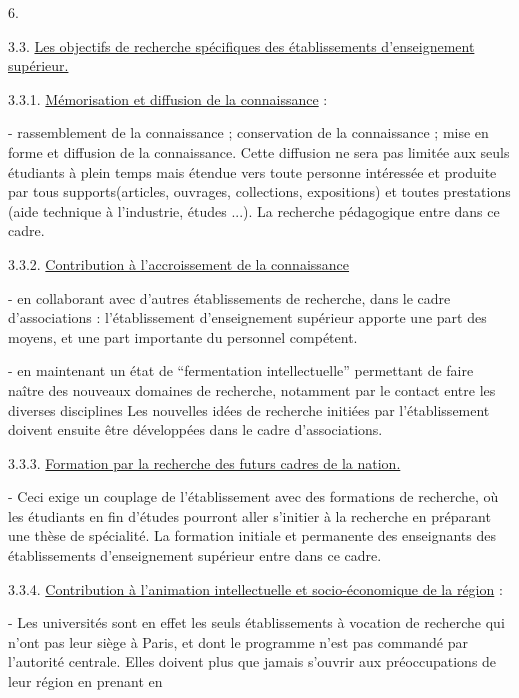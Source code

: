 
\begin{flushright}6.\end{flushright}

3.3. \uline{Les objectifs de recherche spécifiques des établissements d'enseignement supérieur.}

3.3.1. \uline{Mémorisation et diffusion de la connaissance} :

- rassemblement de la connaissance ; conservation de la connaissance ; mise en forme et diffusion de la connaissance. Cette diffusion ne sera pas limitée aux seuls étudiants à plein temps mais étendue vers toute personne intéressée et produite par tous supports(articles, ouvrages, collections, expositions) et toutes prestations (aide technique à l'industrie, études ...). La recherche pédagogique entre dans ce cadre.

3.3.2. \uline{Contribution à l'accroissement de la connaissance}

- en collaborant avec d'autres établissements de recherche, dans le cadre d'associations : l'établissement d'enseignement supérieur apporte une part des moyens, et une part importante du personnel compétent.

- en maintenant un état de ``fermentation intellectuelle'' permettant de faire naître des nouveaux domaines de recherche, notamment par le contact entre les diverses disciplines Les nouvelles idées de recherche\inserted{,} initiées par l'établissement\inserted{,} doivent\inserted{,} ensuite être développées dans le cadre d'associations.

3.3.3. \uline{Formation par la recherche des futurs cadres de la nation.}

- Ceci exige un couplage de l'établissement avec des formations de recherche, où les étudiants en fin d'études pourront aller s'initier à la recherche en préparant une thèse de spécialité. La formation initiale et permanente des enseignants des établissements d'enseignement supérieur entre dans ce cadre.

3.3.4. \uline{Contribution à l'animation intellectuelle et socio-économique de la région} :

- Les universités sont en effet les seuls établissements à vocation de recherche qui n'ont pas leur siège à Paris, et dont le programme n'est pas commandé par l'autorité centrale. Elles doivent plus que jamais s'ouvrir aux préoccupations de leur région en prenant en

